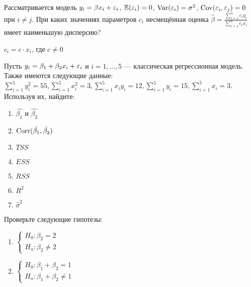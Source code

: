 \documentclass[pdftex,11pt,openany]{book}\usepackage[]{graphicx}\usepackage[]{color}
\begin{document}
\begin{solution}
\end{solution}


\begin{problem}
 Рассматривается модель $y_i=\beta x_i+\varepsilon_i$, $\mathbb{E}(\varepsilon_i)=0$, $\operatorname{Var}(\varepsilon_i)=\sigma^2$, $\operatorname{Cov}(\varepsilon_i,\varepsilon_j)=0$ при $i \ne j$. 
При каких значениях параметров $c_i$ несмещённая оценка $\hat{\beta}=\frac{\sum_{i=1}^n {c_i y_i}}{\sum_{i=1}^n {c_i x_i}}$ имеет наименьшую дисперсию? 
\end{problem}
 
\begin{solution}
$c_i=c\cdot x_i$, где $c\neq 0$ 
\end{solution}


\begin{problem}
 Пусть $y_i = \beta_1 + \beta_2 x_i + \varepsilon_i$ и $i = 1, \dots, 5$ --- классическая регрессионная модель. Также имеются следующие данные: $\sum_{i=1}^5 y_i^2 = 55, \sum_{i=1}^5 x_i^2 = 3, \sum_{i=1}^5 x_iy_i = 12, \sum_{i=1}^5 y_i = 15, \sum_{i=1}^5 x_i = 3.$ Используя их, найдите:

\begin{enumerate}
\item $\hat{\beta_1}$ и $\hat{\beta_2}$
\item $\operatorname{Corr}(\hat{\beta_1}, \hat{\beta_2})$
\item $TSS$
\item $ESS$
\item $RSS$
\item $R^2$
\item $\hat{\sigma}^2$
\end{enumerate}

Проверьте следующие гипотезы:
\begin{enumerate}
\item $\begin{cases}  H_0: \beta_2 = 2  \\ H_a: \beta_2 \not= 2 \end{cases}$
\item $\begin{cases}  H_0: \beta_1 + \beta_2 = 1  \\ H_a: \beta_1 + \beta_2 \not= 1 \end{cases}$
\end{enumerate}
\end{problem}

\begin{solution}
\end{solution}
\end{document}
